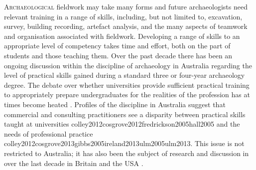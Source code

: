 \documentclass{ijsra}
\begin{document}
\lettrine[nindent=0em,lines=3]{A}{rchaeological} fieldwork may take many forms and future archaeologists need relevant training in a range of skills, including, but not limited to, excavation, survey, building recording, artefact analysis, and the many aspects of teamwork and organisation associated with fieldwork. 
Developing a range of skills to an appropriate level of competency takes time and effort, both on the part of students and those teaching them. Over the past decade there has been an ongoing discussion within the discipline of archaeology in Australia regarding the level of practical skills gained during a standard three or four-year archaeology degree. 
The debate over whether universities provide sufficient practical training to appropriately prepare undergraduates for the realities of the profession has at times become heated \parencites[e.g.][]{cobb2012}{mytum2012a}{ulm2005}{ulm2013}. 
Profiles of the discipline in Australia suggest that commercial and consulting practitioners see a disparity between practical skills taught at universities \parencite{beck2005}{colley2012}{cosgrove2012}{fredrickson2005}{hall2005}
 and the needs of professional practice \parencite{colley2004}{colley2012}{cosgrove2013}{gibbs2005}{ireland2013}{ulm2005}{ulm2013}. 
 This issue is not restricted to Australia; it has also been the subject of research and discussion in over the last decade in Britain \parencites [e.g.][]{aitchinson2004}{cobb2012} and the USA
  \parencite[e.g.][]{boytner2012}.

\clearpage
\IJSRAclosing
\end{document}
